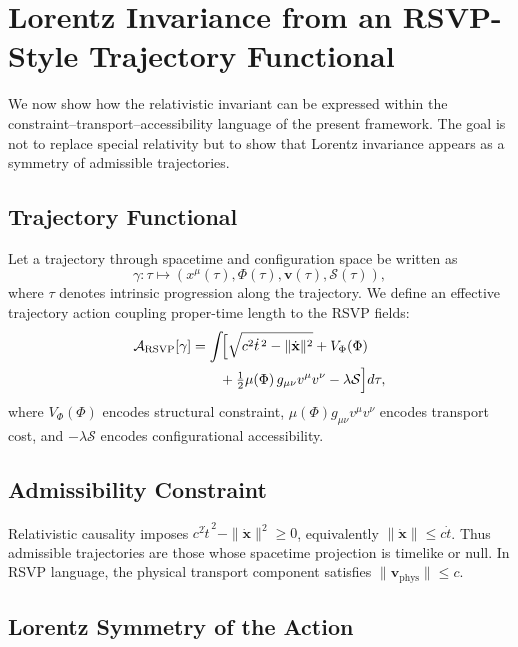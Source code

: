 \documentclass[11pt, a4paper, twocolumn]{article}
\newcommand{\Sfield}{\mathcal{S}}
\begin{document}
\section{Lorentz Invariance from an RSVP-Style Trajectory Functional}

We now show how the relativistic invariant can be expressed within the
constraint--transport--accessibility language of the present framework. The goal
is not to replace special relativity but to show that Lorentz invariance appears
as a symmetry of admissible trajectories.

\subsection{Trajectory Functional}

Let a trajectory through spacetime and configuration space be written as
\[
    \gamma : \tau \mapsto (x^\mu(\tau),\Phi(\tau),\mathbf{v}(\tau),\Sfield(\tau)),
\]
where $\tau$ denotes intrinsic progression along the trajectory. We define an
effective trajectory action coupling proper-time length to the RSVP fields:
\begin{align}
    \mathcal{A}_{\mathrm{RSVP}}[\gamma]
    &=
    \int\!\Bigl[
        \sqrt{c^2\dot{t}^{\,2}-\|\dot{\mathbf{x}}\|^2}
        + V_\Phi(\Phi)
        \notag\\
    &\qquad
        + \tfrac{1}{2}\mu(\Phi)\,g_{\mu\nu}v^\mu v^\nu
        - \lambda \Sfield
    \Bigr]d\tau,
    \label{eq:rsvp_action}
\end{align}
where $V_\Phi(\Phi)$ encodes structural constraint, $\mu(\Phi)g_{\mu\nu}v^\mu
v^\nu$ encodes transport cost, and $-\lambda\Sfield$ encodes configurational
accessibility.

\subsection{Admissibility Constraint}

Relativistic causality imposes $c^2\dot{t}^{\,2}-\|\dot{\mathbf{x}}\|^2 \geq 0$,
equivalently $\|\dot{\mathbf{x}}\| \leq c\dot{t}$. Thus admissible trajectories
are those whose spacetime projection is timelike or null. In RSVP language, the
physical transport component satisfies $\|\mathbf{v}_{\mathrm{phys}}\| \leq c$.

\subsection{Lorentz Symmetry of the Action}
\end{document}
